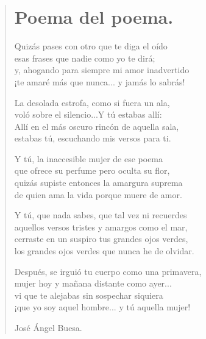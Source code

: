 \documentclass[11pt, portrait, twoside, notitlepage, openright]{book}
\begin{document}
\newpage
\begin{verse}
\begin{center}
\section{Poema del poema.}
\end{center}
Quizás pases con otro que te diga el oído\\
esas frases que nadie como yo te dirá;\\
y, ahogando para siempre mi amor inadvertido\\
¡te amaré más que nunca... y jamás lo sabrás! 
\newline

La desolada estrofa, como si fuera un ala,\\
voló sobre el silencio...Y tú estabas allí:\\
Allí en el más oscuro rincón de aquella sala,\\
estabas tú, escuchando mis versos para ti.
\newline

Y tú, la inaccesible mujer de ese poema\\
que ofrece su perfume pero oculta su flor,\\
quizás supiste entonces la amargura suprema\\
de quien ama la vida porque muere de amor.
\newline

Y tú, que nada sabes, que tal vez ni recuerdes\\
aquellos versos tristes y amargos como el mar,\\
cerraste en un suspiro tus grandes ojos verdes,\\
los grandes ojos verdes que nunca he de olvidar.
\newpage

Después, se irguió tu cuerpo como una primavera,\\
mujer hoy y mañana distante como ayer...\\
vi que te alejabas sin sospechar siquiera\\
¡que yo soy aquel hombre... y tú aquella mujer!
\newline

José Ángel Buesa.
\end{verse}
\end{document}
